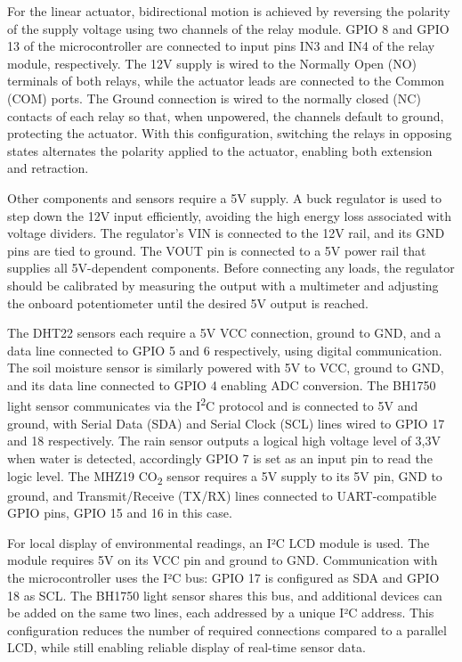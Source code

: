 For the linear actuator, bidirectional motion is achieved by reversing the polarity of the supply voltage using two channels of the relay module. GPIO 8 and GPIO 13 of the microcontroller are connected to input pins IN3 and IN4 of the relay module, respectively. The 12V supply is wired to the Normally Open (NO) terminals of both relays, while the actuator leads are connected to the Common (COM) ports. The Ground connection is wired to the normally closed (NC) contacts of each relay so that, when unpowered, the channels default to ground, protecting the actuator. With this configuration, switching the relays in opposing states alternates the polarity applied to the actuator, enabling both extension and retraction.

Other components and sensors require a 5V supply. A buck regulator is used to step down the 12V input efficiently, avoiding the high energy loss associated with voltage dividers. The regulator’s VIN is connected to the 12V rail, and its GND pins are tied to ground. The VOUT pin is connected to a 5V power rail that supplies all 5V-dependent components. Before connecting any loads, the regulator should be calibrated by measuring the output with a multimeter and adjusting the onboard potentiometer until the desired 5V output is reached.

The DHT22 sensors each require a 5V VCC connection, ground to GND, and a data line connected to GPIO 5 and 6 respectively, using digital communication. The soil moisture sensor is similarly powered with 5V to VCC, ground to GND, and its data line connected to GPIO 4 enabling ADC conversion. The BH1750 light sensor communicates via the I\textsuperscript{2}C protocol and is connected to 5V and ground, with Serial Data (SDA) and Serial Clock (SCL) lines wired to GPIO 17 and 18 respectively. The rain sensor outputs a logical high voltage level of 3,3V when water is detected, accordingly GPIO 7 is set as an input pin to read the logic level. The MHZ19 CO\textsubscript{2} sensor requires a 5V supply to its 5V pin, GND to ground, and Transmit/Receive (TX/RX) lines connected to UART-compatible GPIO pins, GPIO 15 and 16 in this case.

For local display of environmental readings, an I²C LCD module is used. The module requires 5V on its VCC pin and ground to GND. Communication with the microcontroller uses the I²C bus: GPIO 17 is configured as SDA and GPIO 18 as SCL. The BH1750 light sensor shares this bus, and additional devices can be added on the same two lines, each addressed by a unique I²C address. This configuration reduces the number of required connections compared to a parallel LCD, while still enabling reliable display of real-time sensor data. 

